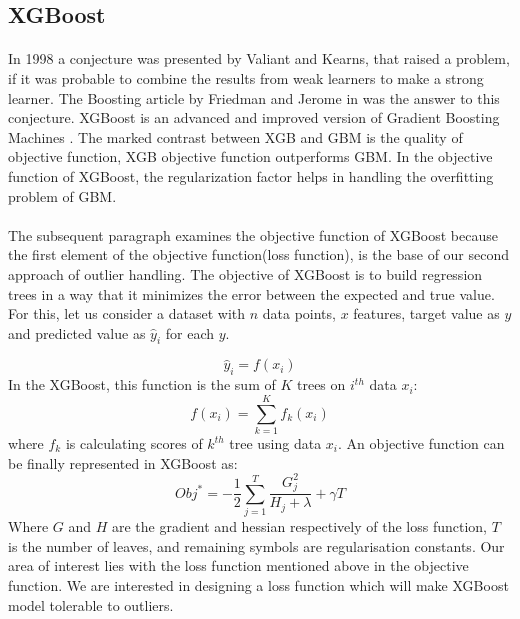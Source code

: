 \documentclass[runningheads]{llncs}
\begin{document}
\subsection{XGBoost}
\paragraph{ }In 1998 a conjecture was presented by Valiant and Kearns, that raised a problem, if it was probable to combine the results from weak learners to make a strong learner. The Boosting article by Friedman and Jerome in \cite{friedman2001greedy} was the answer to this conjecture. XGBoost is an advanced and improved version of Gradient Boosting Machines \cite{chen2016xgboost}. The marked contrast between XGB and GBM is the quality of objective function, XGB objective function outperforms GBM. In the objective function of XGBoost, the regularization factor helps in handling the overfitting problem of GBM.

\paragraph{} The subsequent paragraph examines the objective function of XGBoost because the first element of the objective function(loss function), is the base of our second approach of outlier handling. The objective of XGBoost is to build regression trees in a way that it minimizes the error between the expected and true value. For this, let us consider a dataset with $n$ data points, $x$  features, target value as $y$ and predicted value as $\hat{y}_i$ for each $y$.

\begin{equation}
    \hat{y}_i = f(x_i)
\end{equation}
In the XGBoost, this function is the sum of $K$ trees on $i^{th}$ data $x_i$:
\begin{equation}
    f(x_i) = \sum^K_{k=1} f_k(x_i)
\end{equation}
where $f_k$ is calculating scores of $k^{th}$ tree using data $x_i$. An objective function can be finally represented in XGBoost as:
\begin{equation}
	Obj^*  =  -\frac{1}{2}\sum_{j=1}^T \frac{G_j^2}{H_j + \lambda} + \gamma T
\end{equation}
Where $G$ and $H$ are the gradient and hessian respectively of the loss function, $T$ is the number of leaves, and remaining symbols are regularisation constants. Our area of interest lies with the loss function mentioned above in the objective function. We are interested in designing a loss function which will make XGBoost model tolerable to outliers.
\end{document}
